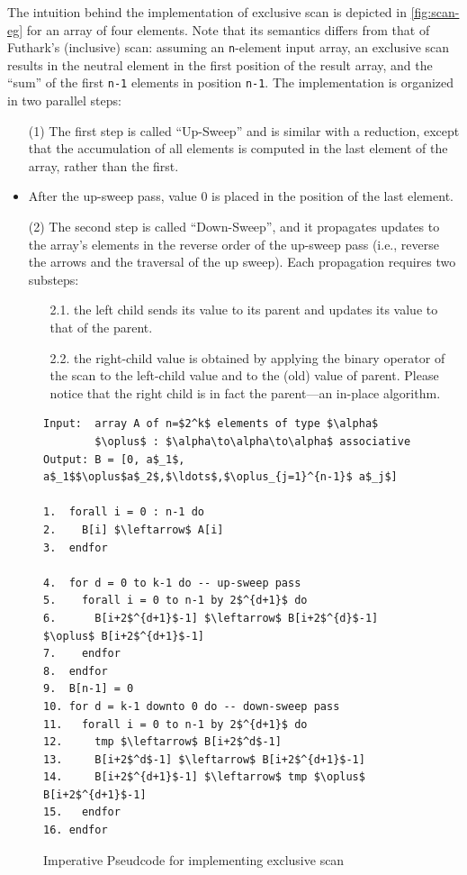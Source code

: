 \documentclass[acmsmall,review]{acmart}\settopmatter{printfolios=true,printccs=false,printacmref=false}
\begin{document}
The intuition behind the implementation of exclusive scan is depicted
in \cref{fig:scan-eg} for an array of four elements. Note that its
semantics differs from that of Futhark's (inclusive) scan: assuming an
{\tt n}-element input array, an exclusive scan results in the neutral 
element in the first position of the result array, and the ``sum'' of 
the first {\tt n-1} elements in position {\tt n-1}. 
The implementation is organized in two parallel steps:
\begin{itemize}
    \item[(1)] The first step is called ``Up-Sweep'' and is similar 
                with a reduction, except that the accumulation of
                all elements is computed in the last element of 
                the array, rather than the first.
    \item After the up-sweep pass, value $0$ is placed in the position
                of the last element. 
    \item[(2)] The second step is called ``Down-Sweep'', and it 
                propagates updates to the array's elements in the 
                reverse order of the up-sweep pass (i.e., reverse the arrows 
                and the traversal of the up sweep). Each propagation
                requires two substeps:
             \begin{itemize}
                \item[2.1.] the left child sends its value to its parent 
                    and updates its value to that of the parent. 
                \item[2.2.] the right-child value is obtained by applying
                            the binary operator of the scan to the left-child 
                            value and to the (old) value of parent.
                Please notice that the right child is in fact the
                            parent---an in-place algorithm.
             \end{itemize}
\end{itemize}


\begin{figure}
\begin{lstlisting}[mathescape=true]
Input:  array A of n=$2^k$ elements of type $\alpha$
        $\oplus$ : $\alpha\to\alpha\to\alpha$ associative
Output: B = [0, a$_1$, a$_1$$\oplus$a$_2$,$\ldots$,$\oplus_{j=1}^{n-1}$ a$_j$]

1.  forall i = 0 : n-1 do
2.    B[i] $\leftarrow$ A[i]
3.  endfor

4.  for d = 0 to k-1 do -- up-sweep pass
5.    forall i = 0 to n-1 by 2$^{d+1}$ do 
6.      B[i+2$^{d+1}$-1] $\leftarrow$ B[i+2$^{d}$-1] $\oplus$ B[i+2$^{d+1}$-1]
7.    endfor
8.  endfor
9.  B[n-1] = 0
10. for d = k-1 downto 0 do -- down-sweep pass
11.   forall i = 0 to n-1 by 2$^{d+1}$ do 
12.     tmp $\leftarrow$ B[i+2$^d$-1]
13.     B[i+2$^d$-1] $\leftarrow$ B[i+2$^{d+1}$-1]
14.     B[i+2$^{d+1}$-1] $\leftarrow$ tmp $\oplus$ B[i+2$^{d+1}$-1]
15.   endfor
16. endfor
\end{lstlisting}\vspace{-4ex}
\caption{Imperative Pseudcode for implementing exclusive scan}
\label{fig:imperative-scan-exc}
\end{figure}
\end{document}
